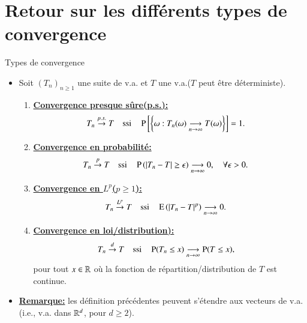        \section{Retour sur les différents types de convergence}
       \frame{\sectionpage}
       \begin{frame}
           [allowframebreaks]{Types de convergence}
           \begin{itemize}
               \item Soit $(T_n)_{n\geq 1}$ une suite de v.a. et $T$ une v.a.($T$ 
               peut être déterministe).\begin{enumerate}[-]
                   \item \textbf{\underline{Convergence presque sûre(p.s.):}}
                   \begin{align*}
                    T_n \overset{p.s.}{\rightarrow} T & \quad \textrm{ssi}\quad
                    \operatorname{P}\left[\left\{\omega: T_n(\omega)\underset{n\rightarrow\infty}{\longrightarrow} T(\omega)\right\}\right] = 1.
                   \end{align*}
                   \item \textbf{\underline{Convergence en probabilité:}} 
                   \begin{align*}
                    T_n \overset{p}{\rightarrow} T & \quad \textrm{ssi}\quad \operatorname{P}\left(\left\vert {T_n-T} \right\vert\geq \epsilon\right)
                    \underset{n\rightarrow\infty}{\longrightarrow} 0, \quad \forall \epsilon > 0.
                   \end{align*}
                   \framebreak
                   \item \textbf{\underline{Convergence en $L^p$($p\geq 1$):}}
                   \begin{align*}
                       T_n\overset{L^p}{\rightarrow} T & \quad \textrm{ssi}\quad \operatorname{E}\left(\left\vert {T_n-T} \right\vert^p\right)
                       \underset{n\rightarrow\infty}{\longrightarrow} 0.
                   \end{align*} 
                   \item \textbf{\underline{Convergence en loi/distribution):}}
                    \begin{align*}
                    T_n\overset{d}{\rightarrow} T & \quad \textrm{ssi}\quad \operatorname{P}(T_n\leq x) \underset{n\rightarrow\infty}{\longrightarrow} \operatorname{P}(T\leq x),
                     \end{align*} 
                   pour tout $x\in\mathbb{R}$ où la fonction de répartition/distribution de $T$ est
                   continue.
               \end{enumerate}
               \item \textbf{\underline{Remarque:}} les définition précédentes peuvent s'étendre aux vecteurs de v.a.(i.e., v.a. dans $\mathbb{R}^d$, pour $d\geq 2$).
           \end{itemize}
       \end{frame}
